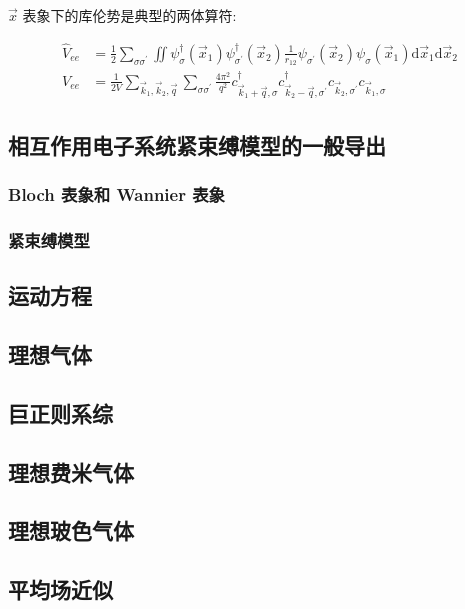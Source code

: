 \documentclass[../../main.tex]{subfiles}
\begin{document}
$\vec{x}$ 表象下的库伦势是典型的两体算符:

\begin{align*}
  \hat{V}_{ee} &= \frac{1}{2}\sum_{\sigma\sigma^{\prime}}\iint\psi_{\sigma}^{\dagger}(\vec{x}_{1})\psi_{\sigma^{\prime}}^{\dagger}(\vec{x}_{2})\frac{1}{r_{12}}\psi_{\sigma^{\prime}}(\vec{x}_{2})\psi_{\sigma}(\vec{x}_{1})\mathrm{d}\vec{x}_{1}\mathrm{d}\vec{x}_{2}\\
  V_{ee} &= \frac{1}{2V}\sum_{\vec{k}_{1},\vec{k}_{2},\vec{q}}\sum_{\sigma\sigma^{\prime}}\frac{4\pi^{2}}{q^{2}}c^{\dagger}_{\vec{k}_{1} + \vec{q},\sigma}c_{\vec{k}_{2}-\vec{q},\sigma^{\prime}}^{\dagger}c_{\vec{k}_{2},\sigma^{\prime}}c_{\vec{k}_{1},\sigma}
\end{align*}

\subsection{相互作用电子系统紧束缚模型的一般导出}
\subsubsection{Bloch 表象和 Wannier 表象}
\subsubsection{紧束缚模型}

\subsection{运动方程}

\subsection{理想气体}
\subsection{巨正则系综}
\subsection{理想费米气体}
\subsection{理想玻色气体}

\subsection{平均场近似}
\end{document}
